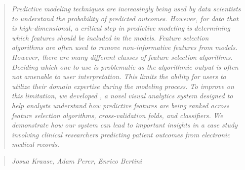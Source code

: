 \begin{quote}
\textit{Predictive modeling techniques are increasingly being used by
data scientists to understand the probability of predicted outcomes.
However, for data that is high-dimensional, a critical step in predictive
modeling is determining which features should be included in the models.
Feature selection algorithms are often used to
remove non-informative features from models.
However, there are many different classes of feature selection algorithms.
Deciding which one to use is problematic as the algorithmic output
is often not amenable to user interpretation.
This limits the ability for users to utilize their
domain expertise during the modeling process.
To improve on this limitation, we developed \infuse ,
a novel visual analytics system designed to help analysts
understand how predictive features are being ranked across
feature selection algorithms, cross-validation folds, and classifiers.
We demonstrate how our system can lead to important insights
in a case study involving clinical researchers predicting patient
outcomes from electronic medical records.
}\end{quote}

\begin{quote}
\textit{Josua Krause, Adam Perer, Enrico Bertini}
\end{quote}
